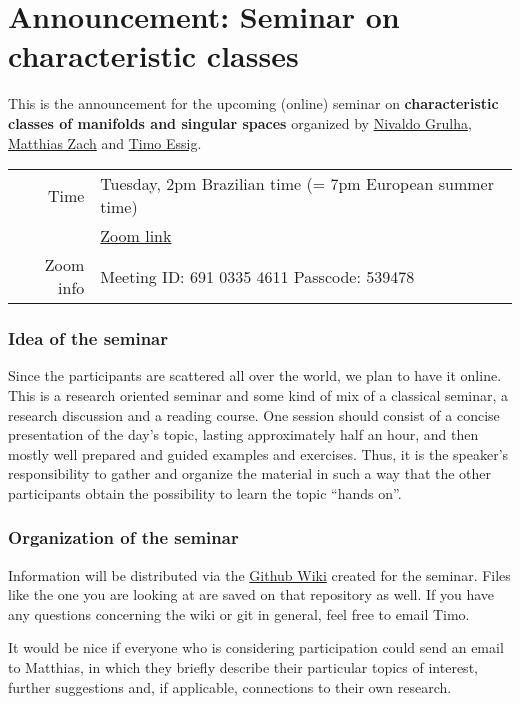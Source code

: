 \documentclass[a4paper]{article}
\begin{document}
\section*{Announcement: Seminar on characteristic classes}

This is the announcement for the upcoming (online) seminar on 
\textbf{characteristic classes of manifolds and singular spaces}
organized by 
\href{mailto:njunior@icmc.usp.br}{Nivaldo Grulha}, 
\href{mailto:zach@math.uni-hannover.de}{Matthias Zach} and 
\href{mailto:essig@math.uni-kiel.de}{Timo Essig}.

\begin{center}
	\begin{tabular}{rl}
		Time & Tuesday, 2pm Brazilian time (= 7pm European summer time) \\
			&  \href{https://uni-kiel.zoom.us/j/69103354611?pwd=TUlmeGZQNlVPSG5YcEtDdndDU1kydz09}{Zoom link} \\
		Zoom info	& Meeting ID: 691 0335 4611 Passcode: 539478
	\end{tabular}
\end{center}

\subsubsection*{Idea of the seminar} 
Since the participants are scattered all over the world, 
we plan to have it online. 
This is a research oriented seminar and some kind of mix of a classical seminar,
a research discussion and a reading course.
One session should consist of a concise presentation of the 
day's topic, lasting approximately half an hour, and then mostly well prepared and 
guided examples and exercises. Thus, it is the speaker's responsibility to gather 
and organize the material in such a way that the other participants obtain the 
possibility to learn the topic ``hands on''. 

\subsubsection*{Organization of the seminar}
Information will be distributed via the 
\href{https://github.com/timoessig/CCSingSem/wiki}{Github Wiki}
created for the seminar. Files like the one you are looking at are saved on that
repository as well. If you have any questions concerning the wiki or git in general,
feel free to email Timo.

It would be nice if everyone who is considering participation could send an 
email to Matthias, in which they briefly describe 
their particular topics of interest, further suggestions and, if applicable, 
connections to their own research. 
\end{document}
